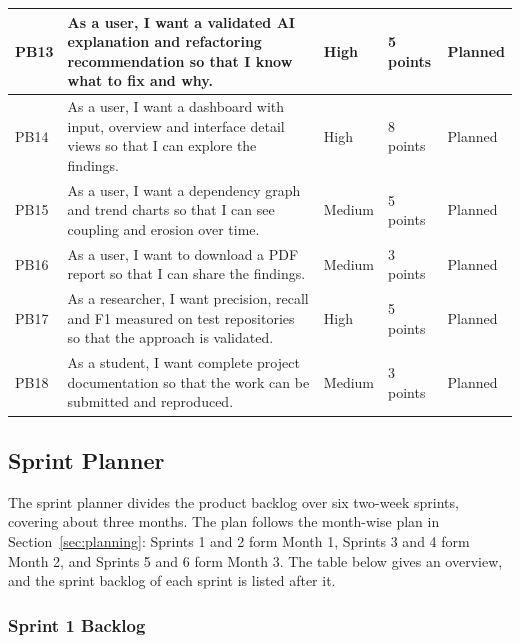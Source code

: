 \documentclass[12pt,a4paper]{article}
\begin{document}
\begin{longtable}[c]{|L{0.45in}|L{2.6in}|L{0.65in}|L{0.85in}|L{0.7in}|}
\hline
PB13 & As a user, I want a validated AI explanation and refactoring recommendation so that I know what to fix and why. & High & 5 points & Planned \\
\hline
PB14 & As a user, I want a dashboard with input, overview and interface detail views so that I can explore the findings. & High & 8 points & Planned \\
\hline
PB15 & As a user, I want a dependency graph and trend charts so that I can see coupling and erosion over time. & Medium & 5 points & Planned \\
\hline
PB16 & As a user, I want to download a PDF report so that I can share the findings. & Medium & 3 points & Planned \\
\hline
PB17 & As a researcher, I want precision, recall and F1 measured on test repositories so that the approach is validated. & High & 5 points & Planned \\
\hline
PB18 & As a student, I want complete project documentation so that the work can be submitted and reproduced. & Medium & 3 points & Planned \\
\hline
\end{longtable}
\endgroup

\subsection{Sprint Planner}

\begin{spacing}{1.5}
\justifying
The sprint planner divides the product backlog over six two-week sprints,
covering about three months. The plan follows the month-wise plan in
Section~\ref{sec:planning}: Sprints 1 and 2 form Month 1, Sprints 3 and 4
form Month 2, and Sprints 5 and 6 form Month 3. The table below gives an
overview, and the sprint backlog of each sprint is listed after it.
\end{spacing}

\subsubsection{Sprint 1 Backlog}
\end{document}
